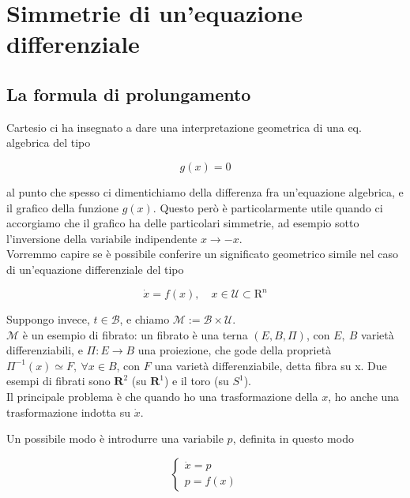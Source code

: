 \documentclass{report}
\begin{document}
\chapter{Simmetrie di un'equazione differenziale}

\section{La formula di prolungamento}

Cartesio ci ha insegnato a dare una interpretazione geometrica di una eq. algebrica del tipo

\begin{equation}
    g(x) = 0 
\end{equation}

al punto che spesso ci dimentichiamo della differenza fra un'equazione algebrica, e il grafico della funzione $g(x)$. Questo però è particolarmente utile quando ci accorgiamo che il grafico ha delle particolari simmetrie, ad esempio sotto l'inversione della variabile indipendente $x \rightarrow -x$. \\

Vorremmo capire se è possibile conferire un significato geometrico simile nel caso di un'equazione differenziale del tipo 

\begin{equation}
    \dot{x} = f(x), \quad x \in \mathcal{U} \subset \mathrm{R}^n
\end{equation}

Suppongo invece, $t \in \mathcal{B}$, e chiamo $\mathcal{M} := \mathcal{B} \times \mathcal{U}$. \\
$\mathcal{M}$ è un esempio di fibrato: un fibrato è una terna $(E, B, \Pi)$, con $E, \ B$ varietà differenziabili, e $\Pi : E \rightarrow B$ una proiezione, che gode della proprietà $\Pi^{-1}(x) \simeq F, \ \forall x \in B$, con $F$ una varietà differenziabile, detta fibra su x. Due esempi di fibrati sono $\mathbf{R}^2$ (su $\mathbf{R}^1$) e il toro (su $S^1$). \\

Il principale problema è che quando ho una trasformazione della $x$, ho anche una trasformazione indotta su $\dot{x}$. 

Un possibile modo è introdurre una variabile $p$, definita in questo modo 

\[\begin{cases}
    \dot{x} = p \\
    p = f(x)
\end{cases}\]
\end{document}
